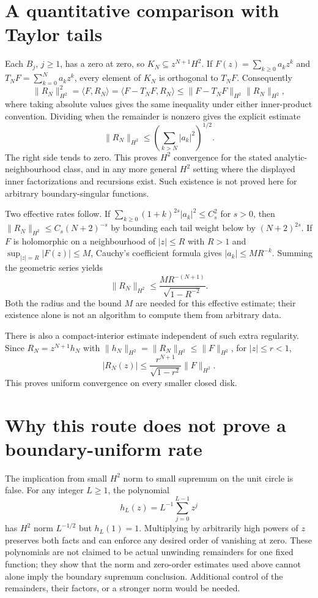 \documentclass[11pt]{article}
\begin{document}
\section{A quantitative comparison with Taylor tails}
Each $B_j$, $j\ge1$, has a zero at zero, so
$K_N\subseteq z^{N+1}H^2$. If $F(z)=\sum_{k\ge0}a_kz^k$
and $T_NF=\sum_{k=0}^Na_kz^k$, every element of $K_N$ is
orthogonal to $T_NF$. Consequently
\[
 \|R_N\|_{H^2}^2=\langle F,R_N\rangle
 =\langle F-T_NF,R_N\rangle
 \le\|F-T_NF\|_{H^2}\|R_N\|_{H^2},
\]
where taking absolute values gives the same inequality under
either inner-product convention. Dividing when the remainder
is nonzero gives the explicit estimate
\[
 \|R_N\|_{H^2}\le
 \left(\sum_{k>N}|a_k|^2\right)^{1/2}.
\]
The right side tends to zero. This proves $H^2$ convergence
for the stated analytic-neighbourhood class, and in any more
general $H^2$ setting where the displayed inner factorizations
and recursions exist. Such existence is not proved here for
arbitrary boundary-singular functions.

Two effective rates follow. If
$\sum_{k\ge0}(1+k)^{2s}|a_k|^2\le C_s^2$ for $s>0$,
then $\|R_N\|_{H^2}\le C_s(N+2)^{-s}$ by bounding each
tail weight below by $(N+2)^{2s}$. If $F$ is holomorphic on
a neighbourhood of $|z|\le R$ with $R>1$ and
$\sup_{|z|=R}|F(z)|\le M$, Cauchy's coefficient formula gives
$|a_k|\le MR^{-k}$. Summing the geometric series yields
\[
 \|R_N\|_{H^2}\le
 \frac{M R^{-(N+1)}}{\sqrt{1-R^{-2}}}.
\]
Both the radius and the bound $M$ are needed for this effective
estimate; their existence alone is not an algorithm to compute
them from arbitrary data.

There is also a compact-interior estimate independent of such
extra regularity. Since $R_N=z^{N+1}h_N$ with
$\|h_N\|_{H^2}=\|R_N\|_{H^2}\le\|F\|_{H^2}$, for
$|z|\le r<1$,
\[
 |R_N(z)|\le\frac{r^{N+1}}{\sqrt{1-r^2}}\|F\|_{H^2}.
\]
This proves uniform convergence on every smaller closed disk.

\section{Why this route does not prove a boundary-uniform rate}
The implication from small $H^2$ norm to small supremum on the
unit circle is false. For any integer $L\ge1$, the polynomial
\[
 h_L(z)=L^{-1}\sum_{j=0}^{L-1}z^j
\]
has $H^2$ norm $L^{-1/2}$ but $h_L(1)=1$.
Multiplying by arbitrarily high powers of $z$ preserves both
facts and can enforce any desired order of vanishing at zero.
These polynomials are not claimed to be actual unwinding
remainders for one fixed function; they show that the norm
and zero-order estimates used above cannot alone imply the
boundary supremum conclusion. Additional control of the
remainders, their factors, or a stronger norm would be needed.
\end{document}
